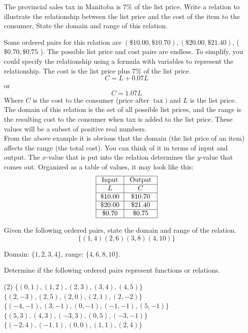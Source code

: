 \documentclass[12pt,fleqn]{book}
\newcommand{\prb}[1]{\begin{Exercise}#1\end{Exercise}}
\newcommand{\sol}[1]{\begin{Answer}#1\end{Answer}}
\begin{document}
\prb{
    The provincial sales tax in Manitoba is $7 \%$ of the list price. Write a relation to illustrate the relationship between the list price and the cost of the item to the consumer. State the domain and range of this relation.
    \\[2in]
}
\sol{
    Some ordered pairs for this relation are $(\$ 10.00, \$ 10.70),(\$ 20.00, \$ 21.40)$, ( $\$ 0.70, \$ 0.75$ ). The possible list price and cost pairs are endless. To simplify, you could specify the relationship using a formula with variables to represent the relationship. The cost is the list price plus 7\% of the list price.
        \[
            C=L+0.07 L
        \]
        or
        \[
            C=1.07 L
        \]
        Where $C$ is the cost to the consumer (price after $\operatorname{tax})$ and $L$ is the list price.
        The domain of this relation is the set of all possible list prices, and the range is the resulting cost to the consumer when tax is added to the list price. These values will be a subset of positive real numbers.
        \\[1em]
        From the above example it is obvious that the domain (the list price of an item) affects the range (the total cost). You can think of it in terms of input and output. The $x$-value that is put into the relation determines the $y$-value that comes out. Organized as a table of values, it may look like this:
    \[
        \begin{array}{|c|c|}
            \hline \text { Input } & \text { Output } \\
            \hline L               & C                \\
            \hline \$ 10.00        & \$ 10.70         \\
            \hline \$ 20.00        & \$ 21.40         \\
            \hline \$ 0.70         & \$ 0.75          \\
            \hline
        \end{array}
    \]
}
\prb{
    Given the following ordered pairs, state the domain and range of the relation.
    \[
        \{(1,4)(2,6)(3,8)(4,10)\}
    \]
    \clearpage}
\sol{Domain: $\{ 1,2,3,4 \}$, range: $\{ 4,6,8,10 \}$.}
\prb{
    Determine if the following ordered pairs represent functions or relations.
    \begin{tasks}(2)
        \task $\{(0,1),(1,2),(2,3),(3,4),(4,5)\}$
        \\[1in]
        \task $\{(2,-3),(2,5),(2,0),(2,1),(2,-2)\}$
        \\[1in]
        \task $\{(-4,-1),(3,-1),(0,-1),(-1,-1),(5,-1)\}$
        \\[1in]
        \task $\{(5,3),(4,3),(-3,3),(0,5),(-3,-1)\}$
        \\[1in]
        \task $\{(-2,4),(-1,1),(0,0),(1,1),(2,4)\}$
        \\[1in]
    \end{tasks}
}
\end{document}
